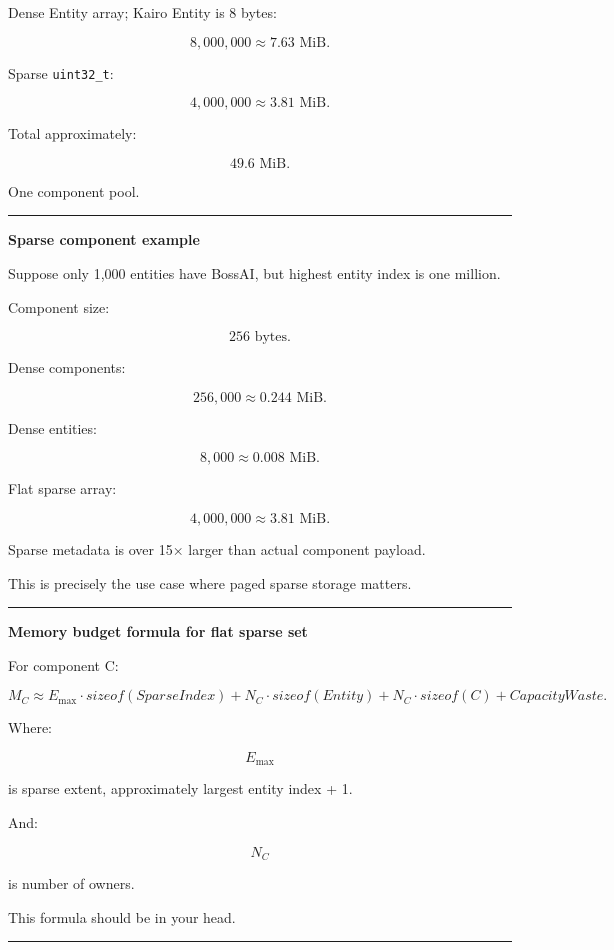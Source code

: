 Dense Entity array; Kairo Entity is 8 bytes:

\[
8,000,000
\approx7.63\text{ MiB}.
\]

Sparse \texttt{uint32\_t}:

\[
4,000,000
\approx3.81\text{ MiB}.
\]

Total approximately:

\[
49.6\text{ MiB}.
\]

One component pool.

\begin{center}\rule{0.5\linewidth}{0.5pt}\end{center}

\textbf{Sparse component example}

Suppose only 1,000 entities have BossAI, but highest entity index is one million.

Component size:

\[
256\text{ bytes}.
\]

Dense components:

\[
256,000
\approx0.244\text{ MiB}.
\]

Dense entities:

\[
8,000
\approx0.008\text{ MiB}.
\]

Flat sparse array:

\[
4,000,000
\approx3.81\text{ MiB}.
\]

Sparse metadata is over 15× larger than actual component payload.

This is precisely the use case where paged sparse storage matters.

\begin{center}\rule{0.5\linewidth}{0.5pt}\end{center}

\textbf{Memory budget formula for flat sparse set}

For component C:

\[
\boxed{
M_C
\approx
E_{\max}\cdot sizeof(SparseIndex)
+
N_C\cdot sizeof(Entity)
+
N_C\cdot sizeof(C)
+
CapacityWaste.
}
\]

Where:

\[
E_{\max}
\]

is sparse extent, approximately largest entity index + 1.

And:

\[
N_C
\]

is number of owners.

This formula should be in your head.

\begin{center}\rule{0.5\linewidth}{0.5pt}\end{center}

